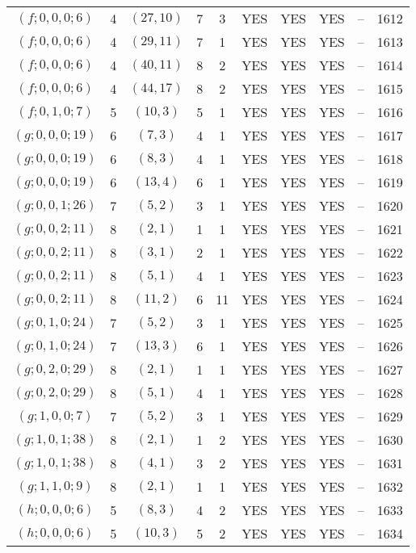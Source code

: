 \begin{longtable}{|c|c|c|c|c|c|c|c|c|c|}
$(f; 0, 0, 0; 6)$ & 4 & $(27, 10)$ & 7 & 3 & YES & YES & YES & -- & 1612\\
$(f; 0, 0, 0; 6)$ & 4 & $(29, 11)$ & 7 & 1 & YES & YES & YES & -- & 1613\\
$(f; 0, 0, 0; 6)$ & 4 & $(40, 11)$ & 8 & 2 & YES & YES & YES & -- & 1614\\
$(f; 0, 0, 0; 6)$ & 4 & $(44, 17)$ & 8 & 2 & YES & YES & YES & -- & 1615\\
$(f; 0, 1, 0; 7)$ & 5 & $(10, 3)$ & 5 & 1 & YES & YES & YES & -- & 1616\\
$(g; 0, 0, 0; 19)$ & 6 & $(7, 3)$ & 4 & 1 & YES & YES & YES & -- & 1617\\
$(g; 0, 0, 0; 19)$ & 6 & $(8, 3)$ & 4 & 1 & YES & YES & YES & -- & 1618\\
$(g; 0, 0, 0; 19)$ & 6 & $(13, 4)$ & 6 & 1 & YES & YES & YES & -- & 1619\\
$(g; 0, 0, 1; 26)$ & 7 & $(5, 2)$ & 3 & 1 & YES & YES & YES & -- & 1620\\
$(g; 0, 0, 2; 11)$ & 8 & $(2, 1)$ & 1 & 1 & YES & YES & YES & -- & 1621\\
$(g; 0, 0, 2; 11)$ & 8 & $(3, 1)$ & 2 & 1 & YES & YES & YES & -- & 1622\\
$(g; 0, 0, 2; 11)$ & 8 & $(5, 1)$ & 4 & 1 & YES & YES & YES & -- & 1623\\
$(g; 0, 0, 2; 11)$ & 8 & $(11, 2)$ & 6 & 11 & YES & YES & YES & -- & 1624\\
$(g; 0, 1, 0; 24)$ & 7 & $(5, 2)$ & 3 & 1 & YES & YES & YES & -- & 1625\\
$(g; 0, 1, 0; 24)$ & 7 & $(13, 3)$ & 6 & 1 & YES & YES & YES & -- & 1626\\
$(g; 0, 2, 0; 29)$ & 8 & $(2, 1)$ & 1 & 1 & YES & YES & YES & -- & 1627\\
$(g; 0, 2, 0; 29)$ & 8 & $(5, 1)$ & 4 & 1 & YES & YES & YES & -- & 1628\\
$(g; 1, 0, 0; 7)$ & 7 & $(5, 2)$ & 3 & 1 & YES & YES & YES & -- & 1629\\
$(g; 1, 0, 1; 38)$ & 8 & $(2, 1)$ & 1 & 2 & YES & YES & YES & -- & 1630\\
$(g; 1, 0, 1; 38)$ & 8 & $(4, 1)$ & 3 & 2 & YES & YES & YES & -- & 1631\\
$(g; 1, 1, 0; 9)$ & 8 & $(2, 1)$ & 1 & 1 & YES & YES & YES & -- & 1632\\
$(h; 0, 0, 0; 6)$ & 5 & $(8, 3)$ & 4 & 2 & YES & YES & YES & -- & 1633\\
$(h; 0, 0, 0; 6)$ & 5 & $(10, 3)$ & 5 & 2 & YES & YES & YES & -- & 1634\\

\end{longtable}
